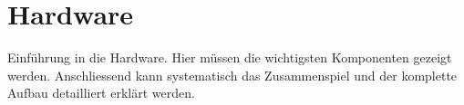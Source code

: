 \section{Hardware} \label{sec:hardware}
Einführung in die Hardware. Hier müssen die wichtigsten Komponenten gezeigt werden. Anschliessend kann systematisch das Zusammenspiel und der komplette Aufbau detailliert erklärt werden.